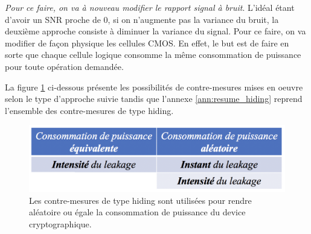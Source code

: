 \documentclass[10pt, oneside, a4paper]{article}
\begin{document}
\begin{enumerate}
\textit{Pour ce faire, on va à nouveau modifier le rapport signal à bruit}. L'idéal étant d'avoir un SNR proche de 0, si on n'augmente pas la variance du bruit, la deuxième approche consiste à diminuer la variance du signal. Pour ce faire, on va modifier de façon physique les cellules CMOS. En effet, le but est de faire en sorte que chaque cellule logique consomme la même consommation de puissance pour toute opération demandée.
\end{enumerate}

La figure \ref{fig:hiding} ci-dessous présente les possibilités de contre-mesures mises en oeuvre selon le type d'approche suivie tandis que l'annexe \ref{ann:resume_hiding} reprend l'ensemble des contre-mesures de type hiding.

\begin{figure}[htbp]
    \centering
    \includegraphics[scale=0.5]{image/hiding}
    \caption{Les contre-mesures de type hiding sont utilisées pour rendre aléatoire ou égale la consommation de puissance du device cryptographique.}
    \label{fig:hiding} 
\end{figure}
\end{document}
